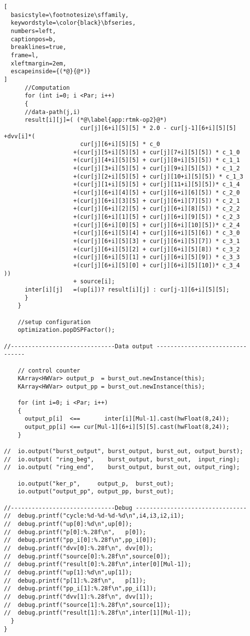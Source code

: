 \begin{lstlisting}[
  basicstyle=\footnotesize\sffamily,
  keywordstyle=\color{black}\bfseries,
  numbers=left,
  captionpos=b,
  breaklines=true,
  frame=l,
  xleftmargin=2em,
  escapeinside={(*@}{@*)}
]
      //Computation
      for (int i=0; i <Par; i++)
      {
      //data-path(j,i)
      result[i][j]=( (*@\label{app:rtmk-op2}@*)
                      cur[j][6+i][5][5] * 2.0 - cur[j-1][6+i][5][5] +dvv[i]*(
                      cur[j][6+i][5][5] * c_0
                    +(cur[j][5+i][5][5] + cur[j][7+i][5][5]) * c_1_0
                    +(cur[j][4+i][5][5] + cur[j][8+i][5][5]) * c_1_1
                    +(cur[j][3+i][5][5] + cur[j][9+i][5][5]) * c_1_2
                    +(cur[j][2+i][5][5] + cur[j][10+i][5][5]) * c_1_3
                    +(cur[j][1+i][5][5] + cur[j][11+i][5][5])* c_1_4
                    +(cur[j][6+i][4][5] + cur[j][6+i][6][5]) * c_2_0
                    +(cur[j][6+i][3][5] + cur[j][6+i][7][5]) * c_2_1
                    +(cur[j][6+i][2][5] + cur[j][6+i][8][5]) * c_2_2
                    +(cur[j][6+i][1][5] + cur[j][6+i][9][5]) * c_2_3
                    +(cur[j][6+i][0][5] + cur[j][6+i][10][5])* c_2_4
                    +(cur[j][6+i][5][4] + cur[j][6+i][5][6]) * c_3_0
                    +(cur[j][6+i][5][3] + cur[j][6+i][5][7]) * c_3_1
                    +(cur[j][6+i][5][2] + cur[j][6+i][5][8]) * c_3_2
                    +(cur[j][6+i][5][1] + cur[j][6+i][5][9]) * c_3_3
                    +(cur[j][6+i][5][0] + cur[j][6+i][5][10])* c_3_4 ))
                    + source[i];
      inter[i][j]   =(up[i])? result[i][j] : cur[j-1][6+i][5][5];
      }
    }

    //setup configuration
    optimization.popDSPFactor();

//------------------------------Data output --------------------------------

    // control counter
    KArray<HWVar> output_p  = burst_out.newInstance(this);
    KArray<HWVar> output_pp = burst_out.newInstance(this);

    for (int i=0; i <Par; i++)
    {
      output_p[i]  <==       inter[i][Mul-1].cast(hwFloat(8,24));
      output_pp[i] <== cur[Mul-1][6+i][5][5].cast(hwFloat(8,24));
    }

//  io.output("burst_output", burst_output, burst_out, output_burst);
//  io.output( "ring_beg",    burst_output, burst_out,  input_ring);
//  io.output( "ring_end",    burst_output, burst_out, output_ring);

    io.output("ker_p",     output_p,  burst_out);
    io.output("output_pp", output_pp, burst_out);

//------------------------------Debug --------------------------------
//  debug.printf("cycle:%d-%d-%d-%d\n",i4,i3,i2,i1);
//  debug.printf("up[0]:%d\n",up[0]);
//  debug.printf("p[0]:%.28f\n",   p[0]);
//  debug.printf("pp_i[0]:%.28f\n",pp_i[0]);
//  debug.printf("dvv[0]:%.28f\n", dvv[0]);
//  debug.printf("source[0]:%.28f\n",source[0]);
//  debug.printf("result[0]:%.28f\n",inter[0][Mul-1]);
//  debug.printf("up[1]:%d\n",up[1]);
//  debug.printf("p[1]:%.28f\n",   p[1]);
//  debug.printf("pp_i[1]:%.28f\n",pp_i[1]);
//  debug.printf("dvv[1]:%.28f\n", dvv[1]);
//  debug.printf("source[1]:%.28f\n",source[1]);
//  debug.printf("result[1]:%.28f\n",inter[1][Mul-1]);
  }
}
\end{lstlisting}